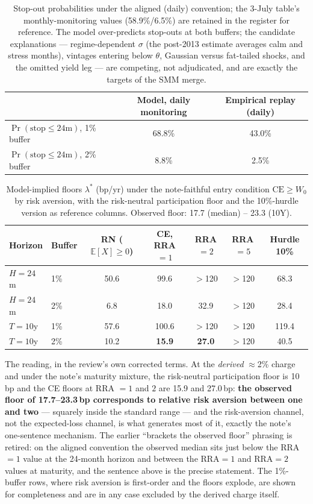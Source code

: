 \documentclass[11pt]{article}
\newcommand{\CE}{\mathrm{CE}}
\begin{document}
\begin{table}[h!]
\centering\small
\begin{tabular}{lcc}
\toprule
 & Model, daily monitoring & Empirical replay (daily) \\
\midrule
$\Pr(\text{stop}\le24\text{m})$, 1\% buffer & 68.8\% & 43.0\% \\
$\Pr(\text{stop}\le24\text{m})$, 2\% buffer & 8.8\% & 2.5\% \\
\bottomrule
\end{tabular}
\caption{Stop-out probabilities under the aligned (daily) convention; the 3-July table's monthly-monitoring values (58.9\%/6.5\%) are retained in the register for reference. The model over-predicts stop-outs at both buffers; the candidate explanations --- regime-dependent $\sigma$ (the post-2013 estimate averages calm and stress months), vintages entering below $\theta$, Gaussian versus fat-tailed shocks, and the omitted yield leg --- are competing, not adjudicated, and are exactly the targets of the SMM merge.}
\end{table}

\begin{table}[h!]
\centering\small
\begin{tabular}{llccccc}
\toprule
Horizon & Buffer & RN ($\mathbb{E}[X]\ge0$) & CE, RRA$=1$ & RRA$=2$ & RRA$=5$ & Hurdle 10\% \\
\midrule
$H=24$m & 1\% & 50.6 & 99.6 & $>$120 & $>$120 & 68.3 \\
$H=24$m & 2\% & 6.8 & 18.0 & 32.9 & $>$120 & 28.4 \\
$T=10$y & 1\% & 57.6 & 100.6 & $>$120 & $>$120 & 119.4 \\
$T=10$y & 2\% & 10.2 & \textbf{15.9} & \textbf{27.0} & $>$120 & 40.5 \\
\bottomrule
\end{tabular}
\caption{Model-implied floors $\lambda^*$ (bp/yr) under the note-faithful entry condition $\CE\ge W_0$ by risk aversion, with the risk-neutral participation floor and the 10\%-hurdle version as reference columns. Observed floor: 17.7 (median) -- 23.3 (10Y).}
\end{table}

The reading, in the review's own corrected terms. At the \emph{derived} $\approx$2\% charge and under the note's maturity mixture, the risk-neutral participation floor is 10\,bp and the CE floors at RRA $=1$ and $2$ are 15.9 and 27.0\,bp: \textbf{the observed floor of 17.7--23.3\,bp corresponds to relative risk aversion between one and two} --- squarely inside the standard range --- and the risk-aversion channel, not the expected-loss channel, is what generates most of it, exactly the note's one-sentence mechanism. The earlier ``brackets the observed floor'' phrasing is retired: on the aligned convention the observed median sits just below the RRA$=1$ value at the 24-month horizon and between the RRA$=1$ and RRA$=2$ values at maturity, and the sentence above is the precise statement. The 1\%-buffer rows, where risk aversion is first-order and the floors explode, are shown for completeness and are in any case excluded by the derived charge itself.
\end{document}
